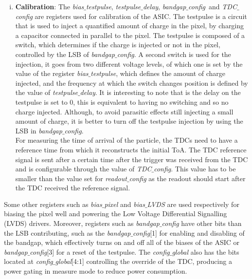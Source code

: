 \begin{enumerate}[i)]
			\item \textbf{Calibration}: The \textit{bias$\_$testpulse}, \textit{testpulse$\_$delay}, \textit{bandgap$\_$config} and \textit{TDC$\_$config} are registers used for calibration of the ASIC. The testpulse is a circuit that is used to inject a quantified amount of charge in the pixel, by charging a capacitor connected in parallel to the pixel. The testpulse is composed of a switch, which determines if the charge is injected or not in the pixel, controlled by the LSB of \textit{bandgap$\_$config}. A second switch is used for the injection, it goes from two different voltage levels, of which one is set by the value of the register \textit{bias$\_$testpulse}, which defines the amount of charge injected, and the frequency at which the switch changes position is defined by the value of \textit{testpulse$\_$delay}. It is interesting to note that is the delay on the testpulse is set to 0, this is equivalent to having no switching and so no charge injected. Although, to avoid parasitic effects still injecting a small amount of charge, it is better to turn off the testpulse injection by using the LSB in \textit{bandgap$\_$config}. \\ For measuring the time of arrival of the particle, the TDCs need to have a reference time from which it reconstructs the initial ToA. The TDC reference signal is sent after a certain time after the trigger was received from the TDC and is configurable through the value of \textit{TDC$\_$config}. This value has to be smaller than the value set for \textit{readout$\_$config} as the readout should start after the TDC received the reference signal.
		\end{enumerate}
		
		Some other registers such as \textit{bias$\_$pixel} and \textit{bias$\_$LVDS} are used respectively for biasing the pixel well and powering the Low Voltage Differential Signalling (LVDS) drivers. Moreover, registers such as \textit{bandgap$\_$config} have other bits than the LSB contributing, such as the \textit{bandgap$\_$config}[1] for enabling and disabling of the bandgap, which effectively turns on and off all of the biases of the ASIC or \textit{bandgap$\_$config}[3] for a reset of the testpulse. The \textit{config$\_$global} also has the bits located at \textit{config$\_$global}[4:1] controlling the override of the TDC, producing a power gating in measure mode to reduce power consumption. \\
		
	\clearpage
